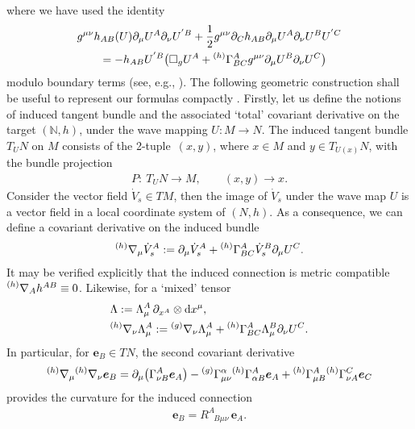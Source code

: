 \documentclass[11pt]{article}
\numberwithin{equation}{section}
\def\ptl{\partial}%
\def\mbo#1{\boldsymbol{#1}}%
\def\grad{{\nabla}}%
\newcommand{\leftexp}[2]{{\vphantom{#2}}^{#1}{#2}}
\def\halb{\frac{1}{2}}%
\def \a{\alpha}
\renewcommand{\a}{\alpha}
\numberwithin{equation}{section}
\begin{document}
where we have used the identity
\begin{align} \label{christof-intro}
& g^{\mu \nu} h_{AB}(U) \ptl_\mu U^A \ptl_\nu U^{'B} + \halb g^{\mu \nu}\ptl_C h_{AB} \ptl_\mu U^A \ptl_\nu U^B U^{'C} \notag\\
&\qquad{} = - h_{AB} U^{'B} \bigl(\square_g U^A + \leftexp{(h)}{\Gamma}^A_{BC} g^{\mu \nu} \ptl_\mu U^B \ptl_\nu U^C\bigr)
\end{align}
modulo boundary terms (see, e.g., \cite[pp.~19--20]{diss_13}). The following geometric construction shall be useful to represent our formulas compactly \cite{Misn_78}. Firstly, let us define the notions of induced tangent bundle and the associated `total' covariant derivative on the target $(\mathbb{N}, h)$, under the wave mapping $U \colon M \to N$. The induced tangent bundle $T_U N$ on $M$ consists of the 2-tuple~$(x, y)$, where $x \in M$ and $y \in T_{U(x)} N$, with the bundle projection
\begin{align*}
P \colon\ T_U N \to M, \qquad
(x, y) \to x.
\end{align*}
Consider the vector field $\dot{V}_s \in TM$, then the image of $\dot{V}_s$ under the wave map $U$ is a vector field \smash{$\dot{V}_s^A = \ptl_s U^A$} in a local coordinate system of $(N, h)$. As a consequence, we can define a covariant derivative on the induced bundle
\begin{align*}
\leftexp{(h)}{\grad}_\mu \dot{V}^A_s := \ptl_\mu \dot{V}_s^A + \leftexp{(h)}{\Gamma}^A_{BC} \dot{V}_s^B \ptl_\mu U^C.
\end{align*}
It may be verified explicitly that the induced connection is metric compatible $\leftexp{(h)}{\grad}_A h^{AB} \equiv 0$. Likewise, for a `mixed' tensor
\begin{align*}
&\Lambda := \Lambda^A_\mu \, \ptl_{x^A} \otimes {\rm d}x^\mu,
\\
&\leftexp{(h)}{\grad}_\nu \Lambda_\mu^A := \leftexp{(g)}{\grad}_\nu \Lambda_\mu^A + \leftexp{(h)}{\Gamma}^A_{BC} \Lambda^B_\mu \ptl_\nu U^C.
\end{align*}
In particular, for $\mbo{e}_B \in TN$, the second covariant derivative
\begin{align*}
\leftexp{(h)}{\grad}_ \mu \leftexp{(h)}{\grad}_\nu \mbo{e}_B = \ptl_\mu \bigl(\Gamma^A_{\nu B} \mbo{e}_A\bigr) - \leftexp{(g)}{\Gamma}^\a_{\mu \nu} \leftexp{(h)}{\Gamma}^A_{\a B} \mbo{e}_A + \leftexp{(h)}{\Gamma}^A_{\mu B} \leftexp{(h)}{\Gamma}^C_{\nu A} \mbo{e}_C
\end{align*}
provides the curvature for the induced connection
\begin{align*}
[ \grad_\mu, \grad_\nu ] \mbo{e}_B = R^A_{\,\,\,\, B \mu \nu} \, \mbo{e}_A.
\end{align*}
\end{document}

